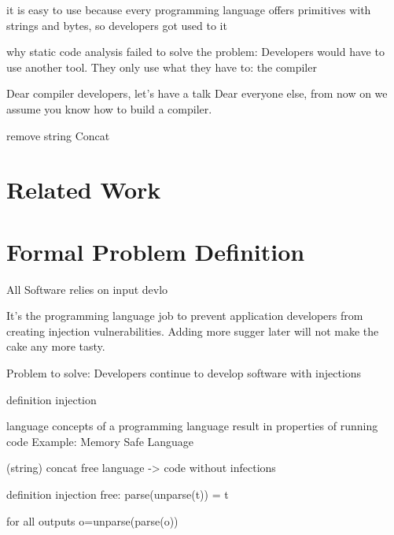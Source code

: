 \documentclass[conference]{IEEEtran}
\newcommand{\punchline}[1]{\textbf{Punch line: #1}}
\renewcommand{\punchline}[1]{}
\begin{document}
\punchline{Why do developers use it}
it is easy to use because every programming language offers primitives with strings and bytes, so developers got used to it

\punchline{Related approaches}
why static code analysis failed to solve the problem: Developers would have to use another tool. They only use what they have to: the compiler

Dear compiler developers, let's have a talk
Dear everyone else, from now on we assume you know how to build a compiler.

\punchline{building SAST into compilers will not solve the problem}
\cite{rice}

\punchline{redesign the language}
remove string Concat

\punchline{the solution has to be as easy as string concatenation}

\punchline{summarize solution from both perspectives}



\section{Related Work}\label{sec:relwork}
\punchline{Lars bashing, how could you assume that developers will use your tool/library}


\section{Formal Problem Definition} \label{sec:problem}


All Software relies on input
devlo

It's the programming language job to prevent application developers from creating injection vulnerabilities.
Adding more sugger later will not make the cake any more tasty.


Problem to solve: Developers continue to develop software with injections

definition injection

language concepts of a programming language result in properties of running code
Example: Memory Safe Language

\punchline{define input safe language}
(string) concat free language -> code without infections

definition injection free: parse(unparse(t)) = t

for all outputs o=unparse(parse(o))
\end{document}

